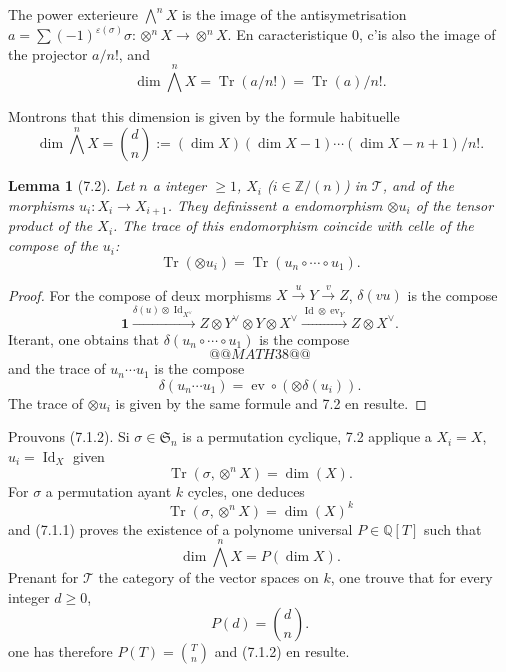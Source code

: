 \documentclass[12pt,a4paper]{article}
\theoremstyle{plain}
\newtheorem{lemma}[theorem]{Lemma}
\theoremstyle{definition}
\DeclareMathOperator{\Id}{Id}
\DeclareMathOperator{\ev}{ev}
\DeclareMathOperator{\Tr}{Tr}
\begin{document}
The power exterieure $\bigwedge^n X$ is the image of the antisymetrisation $a = \sum (-1)^{\varepsilon(\sigma)} \sigma : \otimes^n X \to \otimes^n X$. En caracteristique 0, c'is also the image of the projector $a/n!$, and
\begin{equation}\label{eq:7.1.1}
\dim \bigwedge^n X = \Tr(a/n!) = \Tr(a)/n!.
\end{equation}

Montrons that this dimension is given by the formule habituelle
\begin{equation}\label{eq:7.1.2}
\dim \bigwedge^n X = \binom{d}{n} := (\dim X)(\dim X - 1) \cdots (\dim X - n + 1)/n!.
\end{equation}

\begin{lemma}[7.2]
Let $n$ a integer $\geq 1$, $X_i$ ($i \in \mathbb{Z}/(n)$) in $\mathcal{T}$, and of the morphisms $u_i : X_i \to X_{i+1}$. They definissent a endomorphism $\otimes u_i$ of the tensor product of the $X_i$. The trace of this endomorphism coincide with celle of the compose of the $u_i$:
\begin{equation}\label{eq:7.2.1}
\Tr(\otimes u_i) = \Tr(u_n \circ \cdots \circ u_1).
\end{equation}
\end{lemma}

\begin{proof}
For the compose of deux morphisms $X \xrightarrow{u} Y \xrightarrow{v} Z$, $\delta(vu)$ is the compose
\[
\mathbf{1} \xrightarrow{\delta(u) \otimes \Id_{X^\vee}} Z \otimes Y^\vee \otimes Y \otimes X^\vee \xrightarrow{\Id \otimes \ev_Y} Z \otimes X^\vee.
\]
Iterant, one obtains that $\delta(u_n \circ \cdots \circ u_1)$ is the compose
\[
@@MATH38@@
\]
and the trace of $u_n \cdots u_1$ is the compose
\[
\delta(u_n \cdots u_1) = \ev \circ (\otimes \delta(u_i)).
\]
The trace of $\otimes u_i$ is given by the same formule and 7.2 en resulte.
\end{proof}

Prouvons (7.1.2). Si $\sigma \in \mathfrak{S}_n$ is a permutation cyclique, 7.2 applique a $X_i = X$, $u_i = \Id_X$ given
\[
\Tr(\sigma, \otimes^n X) = \dim(X).
\]
For $\sigma$ a permutation ayant $k$ cycles, one deduces
\[
\Tr(\sigma, \otimes^n X) = \dim(X)^k
\]
and (7.1.1) proves the existence of a polynome universal $P \in \mathbb{Q}[T]$ such that
\[
\dim \bigwedge^n X = P(\dim X).
\]
Prenant for $\mathcal{T}$ the category of the vector spaces on $k$, one trouve that for every integer $d \geq 0$,
\[
P(d) = \binom{d}{n}.
\]
one has therefore $P(T) = \binom{T}{n}$ and (7.1.2) en resulte.
\end{document}

